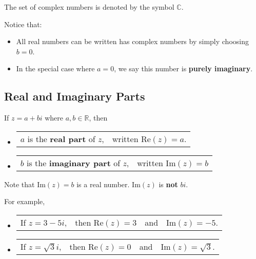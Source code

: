 \documentclass[11pt,a4paper]{book}
\newcommand{\R}{\mathbb{R}}
\newcommand{\C}{\mathbb{C}}
\begin{document}
The set of complex numbers is denoted by the symbol $\C$.

Notice that:

\begin{itemize}

\item  All real numbers can be written has complex numbers by simply
choosing $b=0$.

\item  In the special case where $a=0$, we say this number is \textbf{purely
imaginary}.

\end{itemize}

\subsection{Real and Imaginary Parts}

\begin{tcolorbox}[colback=blue!5, colframe=black, boxrule=.4pt, sharpish corners]

If $z=a+bi$ where $a,b\in\R$, then

\begin{itemize}

\item  %
\begin{tabular}{>{\raggedright}p{4.8cm}>{\raggedright}p{4.5cm}}
$a$ is the \textbf{real part} of $z$, & written $\text{Re}\left(z\right)=a$.\tabularnewline
\end{tabular}

\item  %
\begin{tabular}{>{\raggedright}p{4.8cm}>{\raggedright}p{4.5cm}}
$b$ is the \textbf{imaginary part} of $z$, & written $\text{Im}\left(z\right)=b$\tabularnewline
\end{tabular}

\end{itemize}
\end{tcolorbox}

Note that $\text{Im}\left(z\right)=b$ is a real number. $\text{Im}\left(z\right)$
is \textbf{not }$bi$.

For example,

\begin{itemize}

\item  %
\begin{tabular}{>{\raggedright}p{2cm}>{\raggedright}p{2.4cm}>{\centering}p{0.8cm}>{\raggedright}p{2.5cm}}
If $z=3-5i$,  & then $\text{Re}\left(z\right)=3$ & and  & $\text{Im}\left(z\right)=-5$.\tabularnewline
\end{tabular}

\item  %
\begin{tabular}{>{\raggedright}p{2cm}>{\raggedright}p{2.4cm}>{\centering}p{0.8cm}>{\raggedright}p{2.5cm}}
If $z=\sqrt{3}i$, & then $\text{Re}\left(z\right)=0$ & and  & $\text{Im}\left(z\right)=\sqrt{3}$.\tabularnewline
\end{tabular}

\end{itemize}
\end{document}
